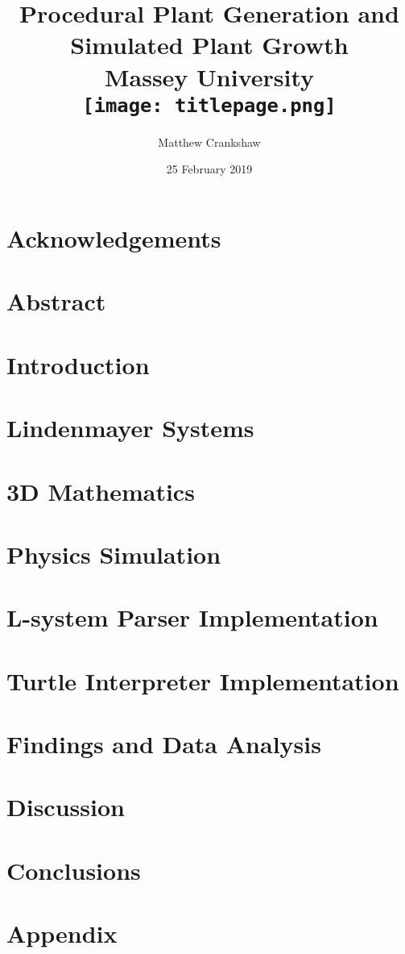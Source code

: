 \documentclass[11pt]{report}
\title{
{ Procedural Plant Generation and Simulated Plant Growth }\\
{\large Massey University}
\\
\vspace{2cm}
{\texttt{[image: titlepage.png]}}
\vspace{2cm}
}
\author{Matthew Crankshaw}
\date{25 February 2019}
\begin{document}
\maketitle

\chapter*{Acknowledgements}

\chapter*{Abstract}

\tableofcontents
\listoffigures
\listoftables


\chapter{Introduction}


\chapter{Lindenmayer Systems}   


\chapter{3D Mathematics}


\chapter{Physics Simulation}


\chapter{L-system Parser Implementation}


\chapter{Turtle Interpreter Implementation}


\chapter{Findings and Data Analysis}


\chapter{Discussion}


\chapter{Conclusions}


\printglossary[type=\acronymtype]
\printglossary

\appendix
\chapter{Appendix}

\end{document}

